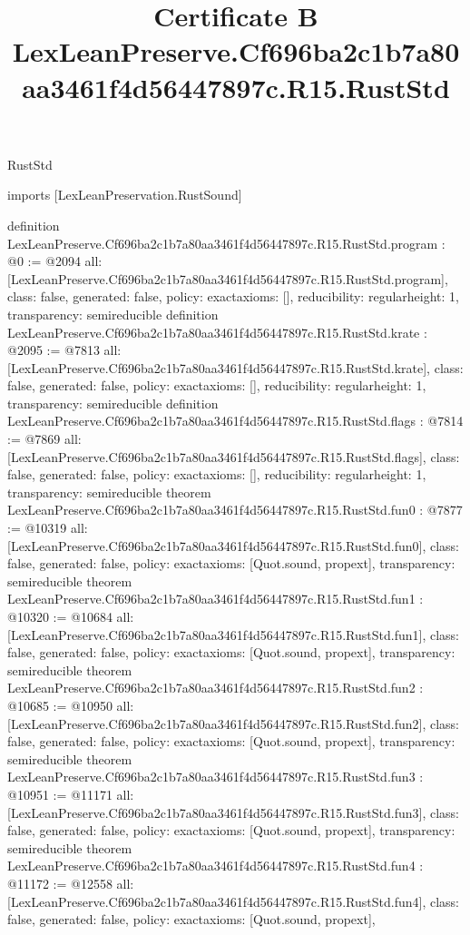 \begin{lexlean}{RustStd}
\title{Certificate B LexLeanPreserve.Cf696ba2c1b7a80aa3461f4d56447897c.R15.RustStd}
\begin{coremodule}
imports [LexLeanPreservation.RustSound]

definition LexLeanPreserve.Cf696ba2c1b7a80aa3461f4d56447897c.R15.RustStd.program : @0 := @2094 {
  all: [LexLeanPreserve.Cf696ba2c1b7a80aa3461f4d56447897c.R15.RustStd.program],
  class: false,
  generated: false,
  policy: exact{axioms: []},
  reducibility: regular{height: 1},
  transparency: semireducible
}
definition LexLeanPreserve.Cf696ba2c1b7a80aa3461f4d56447897c.R15.RustStd.krate : @2095 := @7813 {
  all: [LexLeanPreserve.Cf696ba2c1b7a80aa3461f4d56447897c.R15.RustStd.krate],
  class: false,
  generated: false,
  policy: exact{axioms: []},
  reducibility: regular{height: 1},
  transparency: semireducible
}
definition LexLeanPreserve.Cf696ba2c1b7a80aa3461f4d56447897c.R15.RustStd.flags : @7814 := @7869 {
  all: [LexLeanPreserve.Cf696ba2c1b7a80aa3461f4d56447897c.R15.RustStd.flags],
  class: false,
  generated: false,
  policy: exact{axioms: []},
  reducibility: regular{height: 1},
  transparency: semireducible
}
theorem LexLeanPreserve.Cf696ba2c1b7a80aa3461f4d56447897c.R15.RustStd.fun0 : @7877 := @10319 {
  all: [LexLeanPreserve.Cf696ba2c1b7a80aa3461f4d56447897c.R15.RustStd.fun0],
  class: false,
  generated: false,
  policy: exact{axioms: [Quot.sound, propext]},
  transparency: semireducible
}
theorem LexLeanPreserve.Cf696ba2c1b7a80aa3461f4d56447897c.R15.RustStd.fun1 : @10320 := @10684 {
  all: [LexLeanPreserve.Cf696ba2c1b7a80aa3461f4d56447897c.R15.RustStd.fun1],
  class: false,
  generated: false,
  policy: exact{axioms: [Quot.sound, propext]},
  transparency: semireducible
}
theorem LexLeanPreserve.Cf696ba2c1b7a80aa3461f4d56447897c.R15.RustStd.fun2 : @10685 := @10950 {
  all: [LexLeanPreserve.Cf696ba2c1b7a80aa3461f4d56447897c.R15.RustStd.fun2],
  class: false,
  generated: false,
  policy: exact{axioms: [Quot.sound, propext]},
  transparency: semireducible
}
theorem LexLeanPreserve.Cf696ba2c1b7a80aa3461f4d56447897c.R15.RustStd.fun3 : @10951 := @11171 {
  all: [LexLeanPreserve.Cf696ba2c1b7a80aa3461f4d56447897c.R15.RustStd.fun3],
  class: false,
  generated: false,
  policy: exact{axioms: [Quot.sound, propext]},
  transparency: semireducible
}
theorem LexLeanPreserve.Cf696ba2c1b7a80aa3461f4d56447897c.R15.RustStd.fun4 : @11172 := @12558 {
  all: [LexLeanPreserve.Cf696ba2c1b7a80aa3461f4d56447897c.R15.RustStd.fun4],
  class: false,
  generated: false,
  policy: exact{axioms: [Quot.sound, propext]},
}
\end{coremodule}
\end{lexlean}
